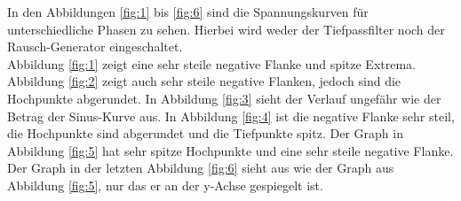 In den Abbildungen \ref{fig:1} bis \ref{fig:6} sind die Spannungskurven für unterschiedliche Phasen
zu sehen. Hierbei wird weder der Tiefpassfilter noch der Rausch-Generator eingeschaltet. \\
Abbildung \ref{fig:1} zeigt eine sehr steile negative Flanke und spitze Extrema. Abbildung \ref{fig:2}
zeigt auch sehr steile negative Flanken, jedoch sind die Hochpunkte abgerundet. In Abbildung \ref{fig:3}
sieht der Verlauf ungefähr wie der Betrag der Sinus-Kurve aus. In Abbildung \ref{fig:4}
ist die negative Flanke sehr steil, die Hochpunkte sind abgerundet und die Tiefpunkte spitz.
Der Graph in Abbildung \ref{fig:5} hat sehr spitze Hochpunkte und eine sehr steile negative Flanke.
Der Graph in der letzten Abbildung \ref{fig:6} sieht aus wie der Graph aus Abbildung \ref{fig:5}, nur
das er an der y-Achse gespiegelt ist.

\newpage

